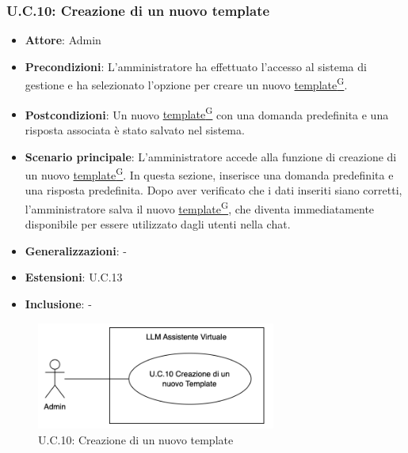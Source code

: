 \subsubsection{U.C.10: Creazione di un nuovo template}
\begin{itemize}
    \item \textbf{Attore}: Admin
    \item \textbf{Precondizioni}: L'amministratore ha effettuato l'accesso al sistema di gestione e ha selezionato l'opzione per creare un nuovo \href{https://code7crusaders.github.io/docs/RTB/documentazione_interna/glossario.html#template}{template\textsuperscript{G}}.
    \item \textbf{Postcondizioni}: Un nuovo \href{https://code7crusaders.github.io/docs/RTB/documentazione_interna/glossario.html#template}{template\textsuperscript{G}} con una domanda predefinita e una risposta associata è stato salvato nel sistema.
    \item \textbf{Scenario principale}: L'amministratore accede alla funzione di creazione di un nuovo \href{https://code7crusaders.github.io/docs/RTB/documentazione_interna/glossario.html#template}{template\textsuperscript{G}}. In questa sezione, inserisce una domanda predefinita e una risposta predefinita. Dopo aver verificato che i dati inseriti siano corretti, l'amministratore salva il nuovo \href{https://code7crusaders.github.io/docs/RTB/documentazione_interna/glossario.html#template}{template\textsuperscript{G}}, che diventa immediatamente disponibile per essere utilizzato dagli utenti nella chat.
    \item \textbf{Generalizzazioni}: -
    \item \textbf{Estensioni}: U.C.13
    \item \textbf{Inclusione}: -
\end{itemize}
\begin{figure}[H]
    \centering
    \includegraphics[width=0.7\textwidth]{img/UC10.png}
    \caption{U.C.10: Creazione di un nuovo template}
\end{figure}
\newpage

